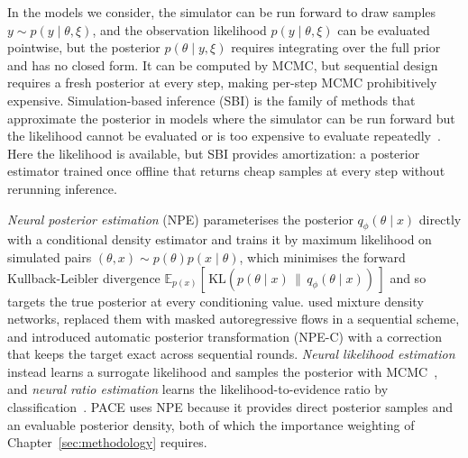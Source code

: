In the models we consider, the simulator can be run forward to draw samples $y\sim p(y\mid\theta,\xi)$, and the observation likelihood $p(y\mid\theta,\xi)$ can be evaluated pointwise, but the posterior $p(\theta\mid y,\xi)$ requires integrating over the full prior and has no closed form. It can be computed by MCMC, but sequential design requires a fresh posterior at every step, making per-step MCMC prohibitively expensive. Simulation-based inference (SBI) is the family of methods that approximate the posterior in models where the simulator can be run forward but the likelihood cannot be evaluated or is too expensive to evaluate repeatedly~\citep{cranmer2020frontier,deistler2025practical}. Here the likelihood is available, but SBI provides amortization: a posterior estimator trained once offline that returns cheap samples at every step without rerunning inference.

\emph{Neural posterior estimation} (NPE) parameterises the posterior $q_\phi(\theta\mid x)$ directly with a conditional density estimator and trains it by maximum likelihood on simulated pairs $(\theta,x)\sim p(\theta)p(x\mid\theta)$, which minimises the forward Kullback-Leibler divergence $\mathbb{E}_{p(x)}[\,\mathrm{KL}(p(\theta\mid x)\,\|\,q_\phi(\theta\mid x))\,]$ and so targets the true posterior at every conditioning value. \citet{papamakarios2016fast} used mixture density networks, \citet{lueckmann2017flexible} replaced them with masked autoregressive flows in a sequential scheme, and \citet{greenberg2019automatic} introduced automatic posterior transformation (NPE-C) with a correction that keeps the target exact across sequential rounds. \emph{Neural likelihood estimation} instead learns a surrogate likelihood and samples the posterior with MCMC~\citep{papamakarios2019sequential}, and \emph{neural ratio estimation} learns the likelihood-to-evidence ratio by classification~\citep{hermans2020likelihood,durkan2020contrastive,miller2022contrastive}. PACE uses NPE because it provides direct posterior samples and an evaluable posterior density, both of which the importance weighting of Chapter~\ref{sec:methodology} requires.


